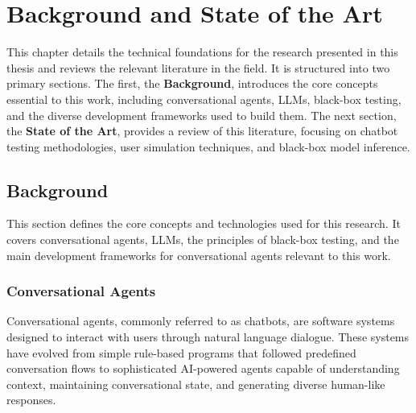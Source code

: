 
\chapter{Background and State of the Art}\label{chapter:state_of_the_art}

This chapter details the technical foundations
for the research presented in this thesis
and reviews the relevant literature in the field.
It is structured into two primary sections.
The first, the \textbf{Background},
introduces the core concepts essential to this work,
including conversational agents, \aclp{LLM}, black-box testing,
and the diverse development frameworks used to build them.
The next section, the \textbf{State of the Art},
provides a review of this literature,
focusing on chatbot testing methodologies,
user simulation techniques, and black-box model inference.

\section{Background}\label{sec:background}

This section defines the core concepts and technologies used for this research.
It covers conversational agents,
\aclp{LLM}, the principles of black-box testing,
and the main development frameworks for conversational agents relevant to this work.

\subsection{Conversational Agents}

Conversational agents, commonly referred to as chatbots,
are software systems designed to interact with users through natural language dialogue.
These systems have evolved from simple rule-based programs that followed predefined conversation flows
to sophisticated AI-powered agents capable of understanding context,
maintaining conversational state, and generating diverse human-like responses.

